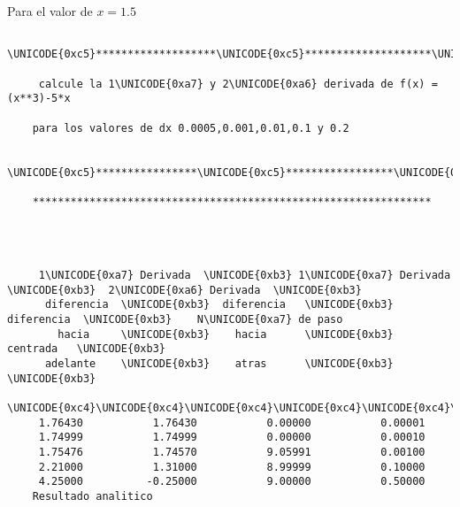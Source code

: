 \documentclass{article}
\begin{document}
Para el valor de $x=1.5$
\begin{verbatim}
  \UNICODE{0xc5}*******************\UNICODE{0xc5}********************\UNICODE{0xc5}********************\UNICODE{0xc5}
 
     calcule la 1\UNICODE{0xa7} y 2\UNICODE{0xa6} derivada de f(x) = (x**3)-5*x
 
    para los valores de dx 0.0005,0.001,0.01,0.1 y 0.2
 
    \UNICODE{0xc5}****************\UNICODE{0xc5}*****************\UNICODE{0xc5}**************************\UNICODE{0xc5}
 
    ***************************************************************
 
                                                    
                                                    
                                                   
     1\UNICODE{0xa7} Derivada  \UNICODE{0xb3} 1\UNICODE{0xa7} Derivada   \UNICODE{0xb3}  2\UNICODE{0xa6} Derivada  \UNICODE{0xb3}             
      diferencia  \UNICODE{0xb3}  diferencia   \UNICODE{0xb3}   diferencia  \UNICODE{0xb3}    N\UNICODE{0xa7} de paso
        hacia     \UNICODE{0xb3}    hacia      \UNICODE{0xb3}    centrada   \UNICODE{0xb3}             
      adelante    \UNICODE{0xb3}    atras      \UNICODE{0xb3}               \UNICODE{0xb3}             
    \UNICODE{0xc4}\UNICODE{0xc4}\UNICODE{0xc4}\UNICODE{0xc4}\UNICODE{0xc4}\UNICODE{0xc4}\UNICODE{0xc4}\UNICODE{0xc4}\UNICODE{0xc4}\UNICODE{0xc4}\UNICODE{0xc4}\UNICODE{0xc4}\UNICODE{0xc4}\UNICODE{0xc4}\UNICODE{0xc5}\UNICODE{0xc4}\UNICODE{0xc4}\UNICODE{0xc4}\UNICODE{0xc4}\UNICODE{0xc4}\UNICODE{0xc4}\UNICODE{0xc4}\UNICODE{0xc4}\UNICODE{0xc4}\UNICODE{0xc4}\UNICODE{0xc4}\UNICODE{0xc4}\UNICODE{0xc4}\UNICODE{0xc4}\UNICODE{0xc4}\UNICODE{0xc5}\UNICODE{0xc4}\UNICODE{0xc4}\UNICODE{0xc4}\UNICODE{0xc4}\UNICODE{0xc4}\UNICODE{0xc4}\UNICODE{0xc4}\UNICODE{0xc4}\UNICODE{0xc4}\UNICODE{0xc4}\UNICODE{0xc4}\UNICODE{0xc4}\UNICODE{0xc4}\UNICODE{0xc4}\UNICODE{0xc4}\UNICODE{0xc5}\UNICODE{0xc4}\UNICODE{0xc4}\UNICODE{0xc4}\UNICODE{0xc4}\UNICODE{0xc4}\UNICODE{0xc4}\UNICODE{0xc4}\UNICODE{0xc4}\UNICODE{0xc4}\UNICODE{0xc4}\UNICODE{0xc4}\UNICODE{0xc4}\UNICODE{0xc4}\UNICODE{0xc4}
     1.76430           1.76430           0.00000           0.00001
     1.74999           1.74999           0.00000           0.00010
     1.75476           1.74570           9.05991           0.00100
     2.21000           1.31000           8.99999           0.10000
     4.25000          -0.25000           9.00000           0.50000
    Resultado analitico
 

\end{verbatim}
\end{document}
